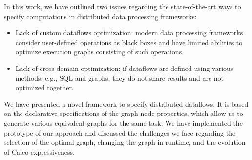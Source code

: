 In this work, we have outlined two issues regarding the state-of-the-art ways to specify computations in distributed data processing frameworks:
\begin{itemize}
    \item Lack of custom dataflows optimization: modern data processing frameworks consider user-defined operations as black boxes and have limited abilities to optimize execution graphs consisting of such operations.
    \item Lack of cross-domain optimization: if dataflows are defined using various methods, e.g., SQL and graphs, they do not share results and are not optimized together.
\end{itemize}

We have presented a novel framework to specify distributed dataflows.
It is based on the declarative specifications of the graph node properties, which allow us to generate various equivalent graphs for the same task.
We have implemented the prototype of our approach and discussed the challenges we face regarding the selection of the optimal graph, changing the graph in runtime, and the evolution of Calco expressiveness.
